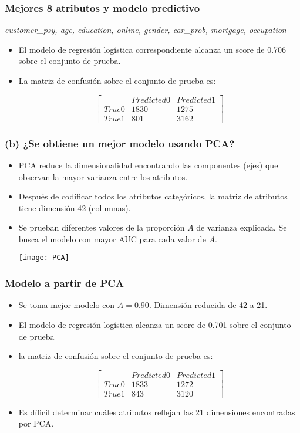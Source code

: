 \documentclass{beamer}
\begin{document}
\begin{frame}[fragile]
    \frametitle{Mejores 8 atributos y modelo predictivo}
    \begin{center} \em customer\_psy, age, education, online, gender,
car\_prob, mortgage, occupation
\end{center}
\begin{itemize}
\item El modelo de regresión logística correspondiente alcanza un score de 0.706 sobre el conjunto de prueba.
\item La matriz de confusión sobre el conjunto de prueba es:
 
\[\begin{bmatrix}
        & Predicted 0 & Predicted  1 \\
   True 0 & 1830 & 1275\\
   True 1 & 801 &3162
 \end{bmatrix}\]
 \end{itemize}
\end{frame}
\begin{frame}[fragile]
    \frametitle{(b) ¿Se obtiene un mejor modelo usando PCA?}
    \begin{itemize}
        \item PCA reduce la dimensionalidad encontrando las componentes (ejes) que observan la mayor varianza entre los
            atributos.
        \item Después de codificar todos los atributos categóricos, la matriz de atributos tiene dimensión 42
            (columnas).
        \item Se prueban diferentes valores de la proporción $A$ de varianza explicada. Se busca el modelo con mayor
            AUC para cada valor de $A$.  
            \vspace{-0.5\baselineskip}
        \begin{center}
            \texttt{[image: PCA]}
        \end{center}
    \end{itemize}
\end{frame}
\begin{frame}
    \frametitle{Modelo a partir de PCA}
    \begin{itemize}
        \item Se toma mejor modelo con $A=0.90$. Dimensión reducida de 42 a 21. 
        \item El modelo de regresión logística alcanza un score de 0.701 sobre el conjunto de prueba 
        \item la matriz de confusión sobre el conjunto de prueba es:

\[\begin{bmatrix}
        & Predicted 0 & Predicted  1 \\
   True 0 & 1833 & 1272\\
   True 1 & 843 &3120
 \end{bmatrix}\]
 \item Es díficil determinar cuáles atributos reflejan las 21 dimensiones encontradas por PCA.
    \end{itemize}
\end{frame}
\end{document}
